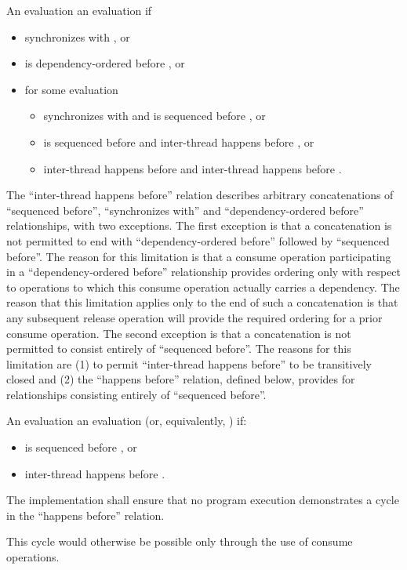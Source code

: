 \pnum
An evaluation   an evaluation 
if
\begin{itemize}
\item
   synchronizes with , or
\item
   is dependency-ordered before , or
\item
  for some evaluation 
  \begin{itemize}
  \item
     synchronizes with  and 
    is sequenced before , or
  \item
     is sequenced before  and 
    inter-thread happens before , or
  \item
     inter-thread happens before  and 
    inter-thread happens before .
  \end{itemize}
\end{itemize}
\begin{note}
The ``inter-thread happens before'' relation describes arbitrary
concatenations of ``sequenced before'', ``synchronizes with'' and
``dependency-ordered before'' relationships, with two exceptions. The first
exception is that a concatenation is not permitted to end with
``dependency-ordered before'' followed by ``sequenced before''. The reason for
this limitation is that a consume operation participating in a
``dependency-ordered before'' relationship provides ordering only with respect
to operations to which this consume operation actually carries a dependency. The
reason that this limitation applies only to the end of such a concatenation is
that any subsequent release operation will provide the required ordering for a
prior consume operation. The second exception is that a concatenation is not
permitted to consist entirely of ``sequenced before''. The reasons for this
limitation are (1) to permit ``inter-thread happens before'' to be transitively
closed and (2) the ``happens before'' relation, defined below, provides for
relationships consisting entirely of ``sequenced before''.
\end{note}

\pnum
An evaluation   an evaluation 
(or, equivalently,   ) if:
\begin{itemize}
\item {} is sequenced before , or
\item {} inter-thread happens before .
\end{itemize}
The implementation shall ensure that no program execution demonstrates a cycle
in the ``happens before'' relation.
\begin{note}
This cycle would otherwise be
possible only through the use of consume operations.
\end{note}

